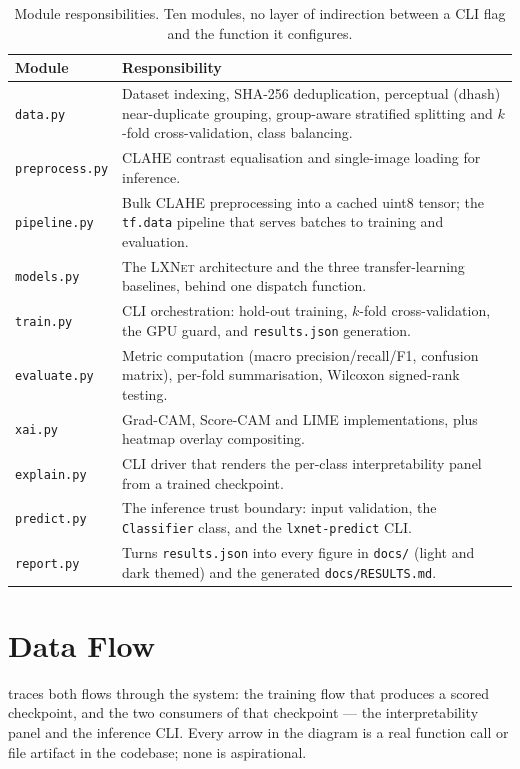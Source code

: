 \documentclass[11pt,a4paper,oneside]{report}
\newcommand{\LXNet}{\textsc{LXNet}}
\newcommand{\code}[1]{\texttt{\small #1}}
\begin{document}
\begin{table}[h]
\centering
\small
\begin{tabularx}{\linewidth}{@{}l X@{}}
\toprule
\textbf{Module} & \textbf{Responsibility} \\
\midrule
\code{data.py} & Dataset indexing, SHA-256 deduplication, perceptual
  (dhash) near-duplicate grouping, group-aware stratified splitting and
  $k$-fold cross-validation, class balancing. \\
\code{preprocess.py} & CLAHE contrast equalisation and single-image loading
  for inference. \\
\code{pipeline.py} & Bulk CLAHE preprocessing into a cached uint8 tensor;
  the \code{tf.data} pipeline that serves batches to training and evaluation. \\
\code{models.py} & The \LXNet{} architecture and the three
  transfer-learning baselines, behind one dispatch function. \\
\code{train.py} & CLI orchestration: hold-out training, $k$-fold
  cross-validation, the GPU guard, and \code{results.json} generation. \\
\code{evaluate.py} & Metric computation (macro precision/recall/F1,
  confusion matrix), per-fold summarisation, Wilcoxon signed-rank testing. \\
\code{xai.py} & Grad-CAM, Score-CAM and LIME implementations, plus heatmap
  overlay compositing. \\
\code{explain.py} & CLI driver that renders the per-class interpretability
  panel from a trained checkpoint. \\
\code{predict.py} & The inference trust boundary: input validation, the
  \code{Classifier} class, and the \code{lxnet-predict} CLI. \\
\code{report.py} & Turns \code{results.json} into every figure in
  \texttt{docs/} (light and dark themed) and the generated
  \texttt{docs/RESULTS.md}. \\
\bottomrule
\end{tabularx}
\caption{Module responsibilities. Ten modules, no layer of indirection
between a CLI flag and the function it configures.}
\label{tab:modules}
\end{table}

\section{Data Flow}

 traces both flows through the system: the training
flow that produces a scored checkpoint, and the two consumers of that
checkpoint --- the interpretability panel and the inference CLI. Every arrow
in the diagram is a real function call or file artifact in the codebase; none
is aspirational.
\end{document}
